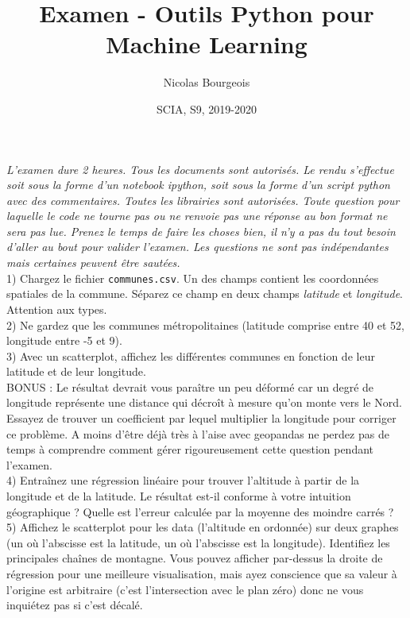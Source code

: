 \documentclass[a4paper]{article}
\title{Examen - Outils Python pour Machine Learning}
\author{Nicolas Bourgeois}
\date{SCIA, S9, 2019-2020}
\begin{document}
\maketitle

\textit{L'examen dure 2 heures. Tous les documents sont autorisés. Le rendu s'effectue soit sous la forme d'un notebook ipython, soit sous la forme d'un script python avec des commentaires. Toutes les librairies sont autorisées. Toute question pour laquelle le code ne tourne pas ou ne renvoie pas une réponse au bon format ne sera pas lue. Prenez le temps de faire les choses bien, il n'y a pas du tout besoin d'aller au bout pour valider l'examen. Les questions ne sont pas indépendantes mais certaines peuvent être sautées.}\\


1) Chargez le fichier \texttt{communes.csv}. Un des champs contient les coordonnées spatiales de la commune. Séparez ce champ en deux champs \textit{latitude} et \textit{longitude}. Attention aux types.\\

2) Ne gardez que les communes métropolitaines (latitude comprise entre 40 et 52, longitude entre -5 et 9).\\

3) Avec un scatterplot, affichez les différentes communes en fonction de leur latitude et de leur longitude. \\

BONUS : Le résultat devrait vous paraître un peu déformé car un degré de longitude représente une distance qui décroît à mesure qu'on monte vers le Nord. Essayez de trouver un coefficient par lequel multiplier la longitude pour corriger ce problème. A moins d'être déjà très à l'aise avec geopandas ne perdez pas de temps à comprendre comment gérer rigoureusement cette question pendant l'examen.\\

4) Entraînez une régression linéaire pour trouver l'altitude à partir de la longitude et de la latitude. Le résultat est-il conforme à votre intuition géographique ? Quelle est l'erreur calculée par la moyenne des moindre carrés ?\\

5) Affichez le scatterplot pour les data (l'altitude en ordonnée) sur deux graphes (un où l'abscisse est la latitude, un où l'abscisse est la longitude). Identifiez les principales chaînes de montagne. Vous pouvez afficher par-dessus la droite de régression pour une meilleure visualisation, mais ayez conscience que sa valeur à l'origine est arbitraire (c'est l'intersection avec le plan zéro) donc ne vous inquiétez pas si c'est décalé.\\
\end{document}
